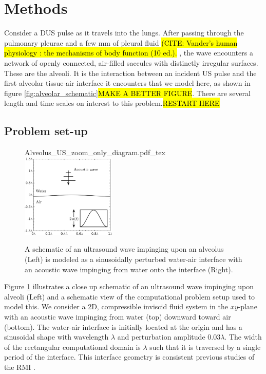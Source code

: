 \section{Methods} \label{sec:methods}%

Consider a \ac{DUS} pulse as it travels into the lungs. After passing
through the pulmonary pleurae and a few mm of pleural fluid \hl{(CITE:
  Vander's human physiology : the mechanisms of body function (10
  ed.). }, the wave encounters a network of openly connected,
air-filled saccules with distinctly irregular surfaces. These are the
alveoli. It is the interaction between an incident \ac{US} pulse and
the first alveolar tissue-air interface it encounters that we model
here, as shown in figure \ref{fig:alveolar_schematic}\hl{MAKE A BETTER
  FIGURE}. There are several length and time scales on interest to this problem.\hl{RESTART HERE}

%
\subsection{Problem set-up}
\label{subsec:setup}
\begin{figure}[h]
  \centering
  \def\svgwidth{0.48\textwidth}
   {Alveolus_US_zoom_only_diagram.pdf_tex} \hfill%
   \includegraphics[width=0.4\textwidth]{./figs/lung_figs/usbe_model_schematic2} \hfill
   \caption[A schematic view of the model problem]{A schematic of an
     ultrasound wave impinging upon an alveolus (Left) is modeled as a
     sinusoidally perturbed water-air interface with an acoustic wave
     impinging from water onto the interface (Right).}
  \label{fig:problem_schematic}
\end{figure}
% 
Figure \ref{fig:problem_schematic} illustrates a close up schematic of
an ultrasound wave impinging upon alveoli (Left) and a schematic view
of the computational problem setup used to model this. We consider a
2D, compressible inviscid fluid system in the $xy$-plane with an
acoustic wave impinging from water (top) downward toward air
(bottom). The water-air interface is initially located at the origin
and has a sinusoidal shape with wavelength $\lambda$ and perturbation
amplitude $0.03\lambda$. The width of the rectangular computational
domain is $\lambda$ such that it is traversed by a single period of
the interface. This interface geometry is consistent previous studies
of the \ac{RMI} \citep{Brouillette2002}.

